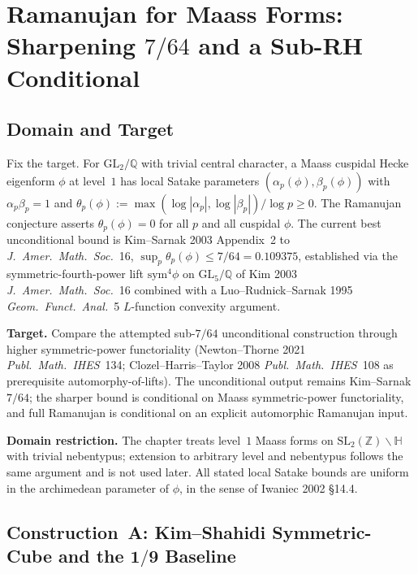 \chapter[Ramanujan for Maass Forms: Sharpening \(7/64\) and a Sub-RH Conditional][Ramanujan for Maass forms]{Ramanujan for Maass Forms: Sharpening \(7/64\) and a Sub-RH Conditional}
\label{v4-arith:w10-c:chapter}

\section{Domain and Target}
\label{v4-arith:w10-c:domain}

Fix the target. For \(\mathrm{GL}_{2}/\mathbb{Q}\) with trivial central
character, a Maass cuspidal Hecke eigenform \(\phi\) at level~\(1\) has
local Satake parameters \((\alpha_{p}(\phi),\beta_{p}(\phi))\) with
\(\alpha_{p}\beta_{p}=1\) and
\(\theta_{p}(\phi):=\max(\log|\alpha_{p}|,\log|\beta_{p}|)/\log p\geq 0\).
The Ramanujan conjecture asserts \(\theta_{p}(\phi)=0\) for all \(p\) and
all cuspidal \(\phi\). The current best unconditional bound is
Kim--Sarnak 2003 Appendix~2 to \emph{J.~Amer.~Math.~Soc.}~16,
\(\sup_{p}\theta_{p}(\phi)\leq 7/64=0.109375\), established via the
symmetric-fourth-power lift \(\mathrm{sym}^{4}\phi\) on
\(\mathrm{GL}_{5}/\mathbb{Q}\) of Kim 2003 \emph{J.~Amer.~Math.~Soc.}~16
combined with a Luo--Rudnick--Sarnak 1995 \emph{Geom.~Funct.~Anal.}~5
\(L\)-function convexity argument.

\textbf{Target.} Compare the attempted sub-\(7/64\)
unconditional construction through higher symmetric-power functoriality
(Newton--Thorne 2021 \emph{Publ.~Math.~IHES}~134; Clozel--Harris--Taylor
2008 \emph{Publ.~Math.~IHES}~108 as prerequisite automorphy-of-lifts).
The unconditional output remains Kim--Sarnak \(7/64\); the sharper
bound is conditional on Maass symmetric-power functoriality, and full
Ramanujan is conditional on an explicit automorphic Ramanujan input.

\textbf{Domain restriction.} The chapter treats level~\(1\) Maass forms
on \(\mathrm{SL}_{2}(\mathbb{Z})\backslash\mathbb{H}\) with trivial
nebentypus; extension to arbitrary level and nebentypus follows the same argument
and is not used later. All
stated local Satake bounds are uniform in the archimedean parameter
of \(\phi\), in the sense of Iwaniec 2002 \S14.4.

\section{Construction~A: Kim--Shahidi Symmetric-Cube and the \(\mathbf{1/9}\) Baseline}
\label{v4-arith:w10-c:construction-A}

